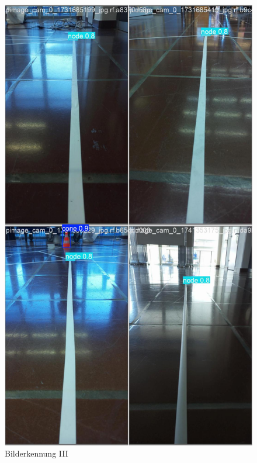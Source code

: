 \begin{figure}[H]
\begin{minipage}[b]{0.28\textwidth}
    \includegraphics[width=\textwidth]{assets/IT/yolo/val_batch2_pred.jpg}
    \caption{Bilderkennung III}
    \label{fig:yolo-iii}
  \end{minipage}
\end{figure}

